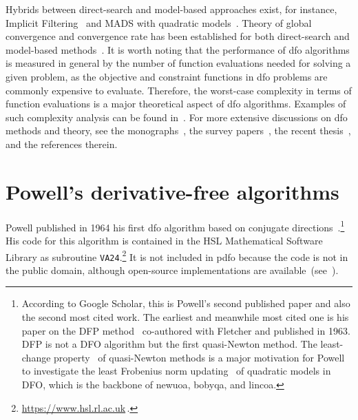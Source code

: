 \documentclass[
    smallextended,  %
    final,          %
]{svjour3}
\begin{document}
Hybrids between direct-search and model-based approaches exist, for
instance, Implicit Filtering~\cite[Algorithm~4.7]{Kelley_2011} and MADS with quadratic models~\cite{Conn_Digabel_2013}.
Theory of global convergence and convergence rate has been established for both direct-search and
model-based methods~\cite{Torczon_1997,Conn_Scheinberg_Toint_1997a,Kolda_Lewis_Torczon_2003,Conn_Scheinberg_Vicente_2009a,Powell_2012,Vicente_2013,Dodangeh_Vicente_2016,Garmanjani_Judice_Vicente_2016}.
It is worth noting that the performance of \gls{dfo} algorithms is measured in general by the number of function evaluations needed for solving a given problem, as the objective and constraint functions in \gls{dfo} problems are commonly
expensive to evaluate.
Therefore, the worst-case complexity in terms of function evaluations is a major theoretical aspect of \gls{dfo} algorithms.
Examples of such complexity analysis can be found in~\cite{Vicente_2013,Gratton_Etal_2015,Dodangeh_Vicente_2016,Dodangeh_Vicente_Zhang_2016}.
For more extensive discussions on \gls{dfo} methods and theory, see the monographs~\cite{Conn_Scheinberg_Vicente_2009b,Audet_Hare_2017}, the survey
papers~\cite{Rios_Sahinidis_2013,Custodio_Scheinberg_Vicente_2017,Larson_Menickelly_Wild_2019}, the recent thesis~\cite{Ragonneau_2022}, and the references therein.

\section{Powell's derivative-free algorithms}
\label{sec:powell}

Powell published in 1964 his first \gls{dfo} algorithm based on conjugate
directions~\cite{Powell_1964}.\footnote{According to Google Scholar, this is Powell's second published paper and also the second most cited work.
The earliest and meanwhile most cited one is his paper on the DFP method~\cite{Fletcher_Powell_1963}
co-authored with Fletcher and published in 1963. DFP is not a DFO algorithm but the first
quasi-Newton method. The least-change property~\cite{Dennis_Schnabel_1979} of quasi-Newton methods
is a major motivation for Powell to investigate the least Frobenius norm updating~\cite{Powell_2004b}
of quadratic models in DFO, which is the backbone of \gls{newuoa}, \gls{bobyqa}, and \gls{lincoa}.}
His code for this algorithm is contained in the
HSL Mathematical Software Library as subroutine \texttt{VA24}.\footnote{\url{https://www.hsl.rl.ac.uk}\,.}
It is not included in \gls{pdfo} because the code is not in the public domain, although open-source implementations are available~(see~\cite[footnote~4]{Conn_Scheinberg_Toint_1997b}).
\end{document}

